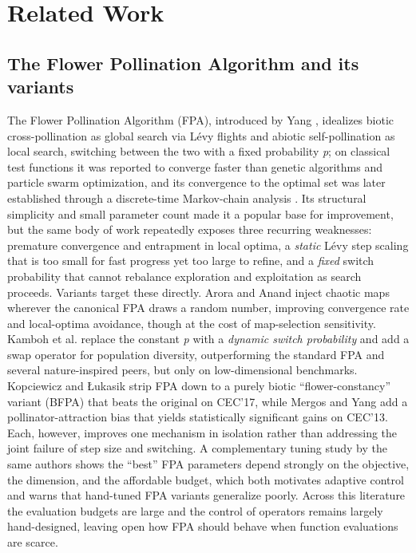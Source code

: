 \documentclass[preprint,12pt]{elsarticle}
\begin{document}
\section{Related Work}
\label{sec2}

\subsection{The Flower Pollination Algorithm and its variants}
\label{subsec2-1}

The Flower Pollination Algorithm (FPA), introduced by Yang \cite{yang2012flower}, idealizes biotic cross-pollination as global search via L\'evy flights and abiotic self-pollination as local search, switching between the two with a fixed probability \emph{p}; on classical test functions it was reported to converge faster than genetic algorithms and particle swarm optimization, and its convergence to the optimal set was later established through a discrete-time Markov-chain analysis \cite{he2017global}. Its structural simplicity and small parameter count made it a popular base for improvement, but the same body of work repeatedly exposes three recurring weaknesses: premature convergence and entrapment in local optima, a \emph{static} L\'evy step scaling that is too small for fast progress yet too large to refine, and a \emph{fixed} switch probability that cannot rebalance exploration and exploitation as search proceeds. Variants target these directly. Arora and Anand \cite{arora2017chaos} inject chaotic maps wherever the canonical FPA draws a random number, improving convergence rate and local-optima avoidance, though at the cost of map-selection sensitivity. Kamboh et al. \cite{kamboh2021improved} replace the constant \emph{p} with a \emph{dynamic switch probability} and add a swap operator for population diversity, outperforming the standard FPA and several nature-inspired peers, but only on low-dimensional benchmarks. Kopciewicz and {\L}ukasik \cite{kopciewicz2019exploiting} strip FPA down to a purely biotic ``flower-constancy'' variant (BFPA) that beats the original on CEC'17, while Mergos and Yang \cite{mergos2022flower} add a pollinator-attraction bias that yields statistically significant gains on CEC'13. Each, however, improves one mechanism in isolation rather than addressing the joint failure of step size and switching. A complementary tuning study by the same authors \cite{mergos2021flower} shows the ``best'' FPA parameters depend strongly on the objective, the dimension, and the affordable budget, which both motivates adaptive control and warns that hand-tuned FPA variants generalize poorly. Across this literature the evaluation budgets are large and the control of operators remains largely hand-designed, leaving open how FPA should behave when function evaluations are scarce.
\end{document}
